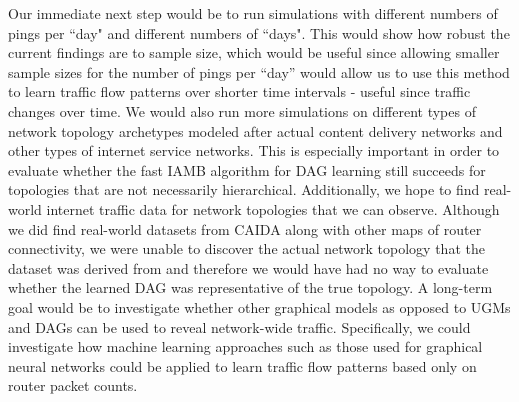 \documentclass[conference]{IEEEtran}
\begin{document}
Our immediate next step would be to run simulations with different numbers of pings per ``day" and different numbers of ``days". This would show how robust the current findings are to sample size, which would be useful since allowing smaller sample sizes for the number of pings per ``day” would allow us to use this method to learn traffic flow patterns over shorter time intervals - useful since traffic changes over time. We would also run more simulations on different types of network topology archetypes modeled after actual content delivery networks and other types of internet service networks. This is especially important in order to evaluate whether the fast IAMB algorithm for DAG learning still succeeds for topologies that are not necessarily hierarchical. Additionally, we hope to find real-world internet traffic data for network topologies that we can observe. Although we did find real-world datasets from CAIDA along with other maps of router connectivity, we were unable to discover the actual network topology that the dataset was derived from and therefore we would have had no way to evaluate whether the learned DAG was representative of the true topology. A long-term goal would be to investigate whether other graphical models as opposed to UGMs and DAGs can be used to reveal network-wide traffic. Specifically, we could investigate how machine learning approaches such as those used for graphical neural networks could be applied to learn traffic flow patterns based only on router packet counts.
\end{document}
